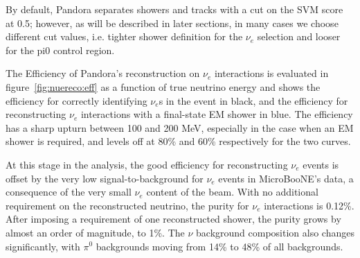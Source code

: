 \documentclass[a4paper]{article}
\begin{document}
By default, Pandora separates showers and tracks with a cut on the SVM score at 0.5; however, as will be described in later sections, in many cases we choose different cut values, i.e. tighter shower definition for the $\nu_e$ selection and looser for the pi0 control region.

\par The Efficiency of Pandora's reconstruction on $\nu_e$ interactions is evaluated in figure~\ref{fig:nuereco:eff} as a function of true neutrino energy and shows the efficiency for correctly identifying $\nu_e$s in the event in black, and the efficiency for reconstructing $\nu_e$ interactions with a final-state EM shower in blue. The efficiency has a sharp upturn between 100 and 200 MeV, especially in the case when an EM shower is required, and levels off at 80\% and 60\% respectively for the two curves. 
\par At this stage in the analysis, the good efficiency for reconstructing $\nu_e$ events is offset by the very low signal-to-background for $\nu_e$ events in MicroBooNE's data, a consequence of the very small $\nu_e$ content of the beam. With no additional requirement on the reconstructed neutrino, the purity for $\nu_e$ interactions is 0.12\%. After imposing a requirement of one reconstructed shower, the purity grows by almost an order of magnitude, to 1\%. The $\nu$ background composition also changes significantly, with $\pi^0$ backgrounds moving from 14\% to 48\% of all backgrounds.
\end{document}
